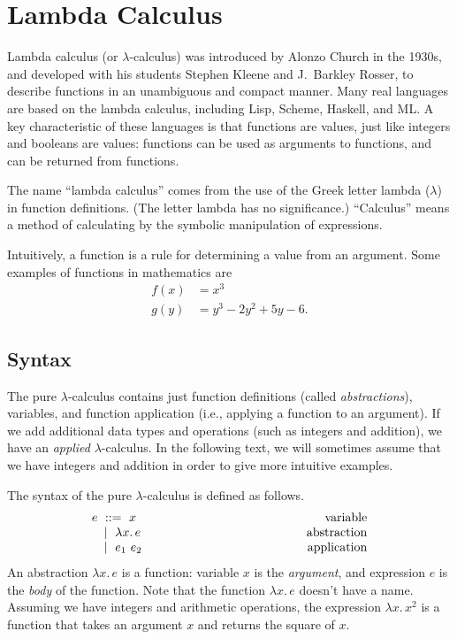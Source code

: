 % 

\chapter{Lambda Calculus}

Lambda calculus (or $\lambda$-calculus) was introduced by Alonzo Church in the 1930s, and developed
with his students Stephen Kleene and J.\ Barkley Rosser, to describe functions in an unambiguous
and compact manner. Many real languages are based on the lambda calculus, including Lisp, Scheme,
Haskell, and ML. A key characteristic of these languages is that functions are values, just like
integers and booleans are values: functions can be used as arguments to functions, and can be
returned from functions.

The name ``lambda calculus'' comes from the use of the Greek letter lambda ($\lambda$) in function
definitions. (The letter lambda has no significance.) ``Calculus'' means a method of calculating
by the symbolic manipulation of expressions.

Intuitively, a function is a rule for determining a value from an argument. Some examples of
functions in mathematics are
\begin{align*}
  f(x)&=x^3\\
  g(y)&=y^3-2y^2+5y-6.
\end{align*}

\section{Syntax}

The pure $\lambda$-calculus contains just function definitions (called \emph{abstractions}),
variables, and function application (i.e., applying a function to an argument). If we add
additional data types and operations (such as integers and addition), we have an \emph{applied}
$\lambda$-calculus. In the following text, we will sometimes assume that we have integers and
addition in order to give more intuitive examples.

The syntax of the pure $\lambda$-calculus is defined as follows.
\[
  \begin{array}{lcp{0.3\textwidth}r}
    e\ ::=\ x & & & \text{variable}\\
    \quad\mid\ \lambda x.\,e & & & \text{abstraction}\\
    \quad\mid\ e_1\ e_2 & & & \text{application}
  \end{array}
\]
An abstraction $\lambda x.\,e$ is a function: variable $x$ is the \emph{argument}, and expression
$e$ is the \emph{body} of the function. Note that the function $\lambda x.\,e$ doesn't have a name.
Assuming we have integers and arithmetic operations, the expression $\lambda x.\,x^2$ is a function
that takes an argument $x$ and returns the square of $x$.

